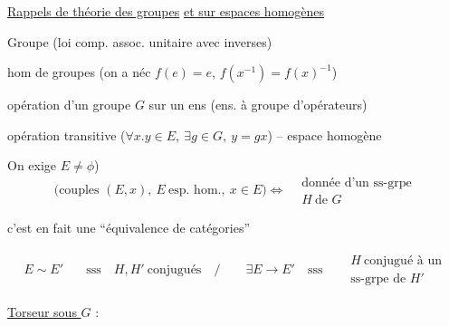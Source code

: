 \uline{Rappels de théorie des groupes} \uline{et sur espaces homogènes}

Groupe (loi comp. assoc. unitaire avec inverses)

hom de groupes (on a néc $f(e)=e$, $f(x^{-1})=f(x)^{-1}$)

opération d'un groupe $G$ sur un ens (ens. à groupe d'opérateurs)

opération transitive ($\forall x\mathord{.}y\in E,\ \exists g\in G,\ y=gx$) -- espace homogène

On exige  $E\ne\phi$)
\[
\bigl(\text{couples }(E,x),\ E\ \text{esp. hom.},\ x\in E\bigr)
\Longleftrightarrow
\begin{aligned}&\text{donnée d'un ss-grpe}\\&H\ \text{de }G\end{aligned}
\]

c'est en fait une ``équivalence de catégories''

{\small
{}}
{\small
\[
\begin{aligned}
E\sim E' \quad &\text{sss}\quad H,H'\ \text{conjugués}\quad \big/\qquad
\exists E\to E'\quad\text{sss}\quad \begin{aligned}&H\ \text{conjugué à un}\\&\text{ss-grpe de }H'\end{aligned}
\end{aligned}
\]}

\uline{Torseur sous $G$} :
{\small
{}}

